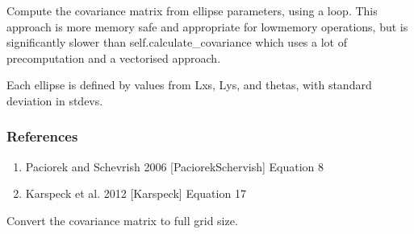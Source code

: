 \documentclass[letterpaper,10pt,english]{sphinxmanual}
\begin{document}
\begin{fulllineitems}

\begin{fulllineitems}
\label{\detokenize{ellipse:glomar_gridding.ellipse.EllipseCovarianceBuilder.calculate_covariance_loop}}
\pysigstartsignatures
\pysiglinewithargsret
{}
{}
{}
\pysigstopsignatures
\sphinxAtStartPar
Compute the covariance matrix from ellipse parameters, using a loop.
This approach is more memory safe and appropriate for low\sphinxhyphen{}memory
operations, but is significantly slower than self.calculate\_covariance
which uses a lot of pre\sphinxhyphen{}computation and a vectorised approach.

\sphinxAtStartPar
Each ellipse is defined by values from Lxs, Lys, and thetas, with
standard deviation in stdevs.
\begin{quote}\begin{description}
\sphinxAtStartPar
{}

\end{description}\end{quote}
\subsubsection*{References}
\begin{enumerate}
%
\item {}
\sphinxAtStartPar
Paciorek and Schevrish 2006 {[}PaciorekSchervish{]} Equation 8

\item {}
\sphinxAtStartPar
Karspeck et al. 2012 {[}Karspeck{]} Equation 17

\end{enumerate}

\end{fulllineitems}


\begin{fulllineitems}
\label{\detokenize{ellipse:glomar_gridding.ellipse.EllipseCovarianceBuilder.uncompress_cov}}
\pysigstartsignatures
\pysiglinewithargsret
{}
{\sphinxparamcomma {}}
{}
\pysigstopsignatures
\sphinxAtStartPar
Convert the covariance matrix to full grid size.


\end{fulllineitems}
\end{fulllineitems}
\end{document}
